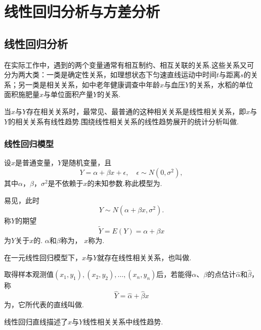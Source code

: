 \chapter{线性回归分析与方差分析}
\section{线性回归分析}
在实际工作中，遇到的两个变量通常有相互制约、相互关联的关系.这些关系又可分为两大类：一类是确定性关系，如理想状态下匀速直线运动中时间\(t\)与距离\(s\)的关系；另一类是相关关系，如中老年健康调查中年龄\(x\)与血压\(Y\)的关系，水稻的单位面积施肥量\(x\)与单位面积产量\(Y\)的关系.

当\(x\)与\(Y\)存在相关关系时，最常见、最普通的这种相关关系是线性相关关系，即\(x\)与\(Y\)的相关关系有线性趋势.围绕线性相关关系的线性趋势展开的统计分析叫做.

\subsection{线性回归模型}
\begin{definition}
设\(x\)是普通变量，\(Y\)是随机变量，且\[
Y = \alpha + \beta x + \epsilon,
\quad \epsilon \sim N(0,\sigma^2),
\]其中\(\alpha\)，\(\beta\)，\(\sigma^2\)是不依赖于\(x\)的未知参数.称此模型为.

易见，此时\[
	Y \sim N(\alpha + \beta x,\sigma^2).
\]
称\(Y\)的期望\[
	\tilde{Y} = E(Y) = \alpha + \beta x
\]为\(Y\)关于\(x\)的.
\(\alpha\)和\(\beta\)称为，
\(x\)称为.

在一元线性回归模型下，\(x\)与\(Y\)就存在线性相关关系，也叫做.

取得样本观测值\((x_1,y_1),(x_2,y_2),\dotsc,(x_n,y_n)\)后，若能得\(\alpha\)、\(\beta\)的点估计\(\hat{\alpha}\)和\(\hat{\beta}\)，称\[
\hat{Y} = \hat{\alpha} + \hat{\beta} x
\]为，它所代表的直线叫做.
\end{definition}
线性回归直线描述了\(x\)与\(Y\)线性相关关系中线性趋势.

